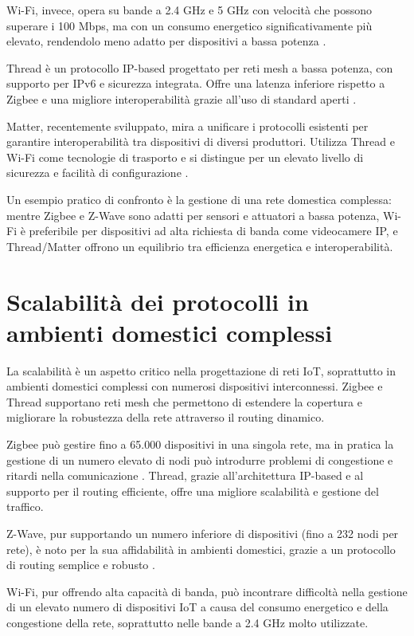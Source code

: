 Wi-Fi, invece, opera su bande a 2.4 GHz e 5 GHz con velocità che possono superare i 100 Mbps, ma con un consumo energetico significativamente più elevato, rendendolo meno adatto per dispositivi a bassa potenza \cite{WiFiVsIoT}.

Thread è un protocollo IP-based progettato per reti mesh a bassa potenza, con supporto per IPv6 e sicurezza integrata. Offre una latenza inferiore rispetto a Zigbee e una migliore interoperabilità grazie all’uso di standard aperti \cite{ThreadProtocol}.

Matter, recentemente sviluppato, mira a unificare i protocolli esistenti per garantire interoperabilità tra dispositivi di diversi produttori. Utilizza Thread e Wi-Fi come tecnologie di trasporto e si distingue per un elevato livello di sicurezza e facilità di configurazione \cite{MatterWhitePaper}.

Un esempio pratico di confronto è la gestione di una rete domestica complessa: mentre Zigbee e Z-Wave sono adatti per sensori e attuatori a bassa potenza, Wi-Fi è preferibile per dispositivi ad alta richiesta di banda come videocamere IP, e Thread/Matter offrono un equilibrio tra efficienza energetica e interoperabilità.

\section{Scalabilità dei protocolli in ambienti domestici complessi}
La scalabilità è un aspetto critico nella progettazione di reti IoT, soprattutto in ambienti domestici complessi con numerosi dispositivi interconnessi. Zigbee e Thread supportano reti mesh che permettono di estendere la copertura e migliorare la robustezza della rete attraverso il routing dinamico.

Zigbee può gestire fino a 65.000 dispositivi in una singola rete, ma in pratica la gestione di un numero elevato di nodi può introdurre problemi di congestione e ritardi nella comunicazione \cite{ZigbeeScalability}. Thread, grazie all’architettura IP-based e al supporto per il routing efficiente, offre una migliore scalabilità e gestione del traffico.

Z-Wave, pur supportando un numero inferiore di dispositivi (fino a 232 nodi per rete), è noto per la sua affidabilità in ambienti domestici, grazie a un protocollo di routing semplice e robusto \cite{ZWaveScalability}.

Wi-Fi, pur offrendo alta capacità di banda, può incontrare difficoltà nella gestione di un elevato numero di dispositivi IoT a causa del consumo energetico e della congestione della rete, soprattutto nelle bande a 2.4 GHz molto utilizzate.

